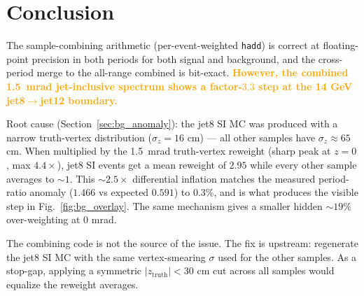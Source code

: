 \documentclass[11pt,a4paper]{article}
\newcommand{\warn}[1]{\textcolor{orange}{\textbf{#1}}}
\begin{document}
\section{Conclusion}

The sample-combining arithmetic (per-event-weighted \texttt{hadd}) is correct at floating-point precision in both periods for both signal and background, and the cross-period merge to the all-range combined is bit-exact. \warn{However, the combined 1.5~mrad jet-inclusive spectrum shows a factor-$3.3$ step at the 14 GeV jet8$\rightarrow$jet12 boundary.}

Root cause (Section~\ref{sec:bg_anomaly}): the jet8 SI MC was produced with a narrow truth-vertex distribution ($\sigma_z = 16$ cm) --- all other samples have $\sigma_z \approx 65$ cm. When multiplied by the 1.5~mrad truth-vertex reweight (sharp peak at $z=0$, max $4.4\times$), jet8 SI events get a mean reweight of $2.95$ while every other sample averages to $\sim 1$. This $\sim 2.5\times$ differential inflation matches the measured period-ratio anomaly ($1.466$ vs expected $0.591$) to 0.3\%, and is what produces the visible step in Fig.~\ref{fig:bg_overlay}. The same mechanism gives a smaller hidden $\sim 19\%$ over-weighting at 0 mrad.

The combining code is not the source of the issue. The fix is upstream: regenerate the jet8 SI MC with the same vertex-smearing $\sigma$ used for the other samples. As a stop-gap, applying a symmetric $|z_{\mathrm{truth}}| < 30$ cm cut across all samples would equalize the reweight averages.
\end{document}
